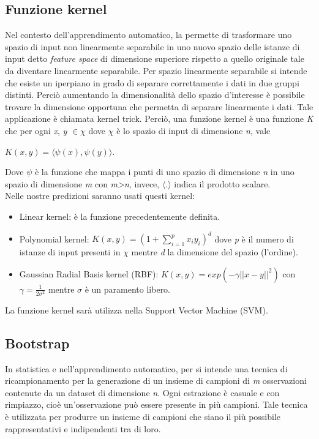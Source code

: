 \subsection{Funzione kernel}
Nel contesto dell'apprendimento automatico, la \textit{\cite{kernel}} permette di trasformare uno spazio di input non linearmente separabile in uno nuovo spazio delle istanze di input detto \emph{feature space} di dimensione superiore rispetto a quello originale tale da diventare linearmente separabile. Per spazio linearmente separabile si intende che esiste un iperpiano in grado di separare correttamente i dati in due gruppi distinti. Perciò aumentando la dimensionalità dello spazio d'interesse è possibile trovare la dimensione opportuna che permetta di separare linearmente i dati. Tale applicazione è chiamata kernel trick. Perciò, una funzione kernel è una funzione \emph{K} che per ogni \emph{x}, \emph{y} $\in \chi$ dove $\chi$ è lo spazio di input di dimensione \emph{n}, vale 
\begin{center}
	$K(x,y) =  \langle\psi(x),\psi(y)\rangle $.
\end{center}
Dove $\psi$ è la funzione che mappa i punti di uno spazio di dimensione \emph{n} in uno spazio di dimensione \emph{m} con \emph{m>n}, invece, $\langle . \rangle$ indica il prodotto scalare.\\
Nelle nostre predizioni saranno usati questi kernel:
\begin{itemize}
	\item Linear kernel: è la funzione precedentemente definita.
	\item Polynomial kernel: $K(x,y) =  \left(1 + \sum_{i = 1}^{p}x_iy_i\right)^{d} $ dove \emph{p} è il numero di istanze di input presenti in $\chi$ mentre \emph{d} la dimensione del spazio (l'ordine).
	\item Gaussian Radial Basis kernel (RBF): $K(x,y) = exp(-\gamma||x-y||^2) $ con $\gamma=\frac{1}{2\sigma^2}$ mentre $\sigma$ è un paramento libero. 
\end{itemize}
La funzione kernel sarà utilizza nella Support Vector Machine (SVM).

\subsection{Bootstrap}
In statistica e nell'apprendimento automatico, per \textit{\cite{bootstrap}} si intende una tecnica di ricampionamento per la generazione di un insieme di campioni di \emph{m} osservazioni contenute da un dataset di dimensione \emph{n}. Ogni estrazione è casuale e con rimpiazzo, cioè un’osservazione può essere presente in più campioni. Tale tecnica è utilizzata per produrre un insieme di campioni che siano il più possibile rappresentativi e indipendenti tra di loro.\\

